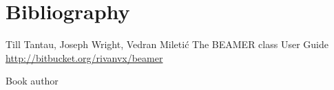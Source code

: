 \documentclass[aspectratio=169]{beamer}
\begin{document}
 \section{Bibliography}
 \begin{frame}{\secname}
   \begin{thebibliography}{3}
     \beamertemplatearticlebibitems
     Till Tantau, Joseph Wright, Vedran Mileti\'c
     \newblock The BEAMER class User Guide
     \newblock \href{http://bitbucket.org/rivanvx/beamer}{http://bitbucket.org/rivanvx/beamer}

     \beamertemplatebookbibitems
     Book author
   \end{thebibliography}
 \end{frame}

 \finalpage
\end{document}
